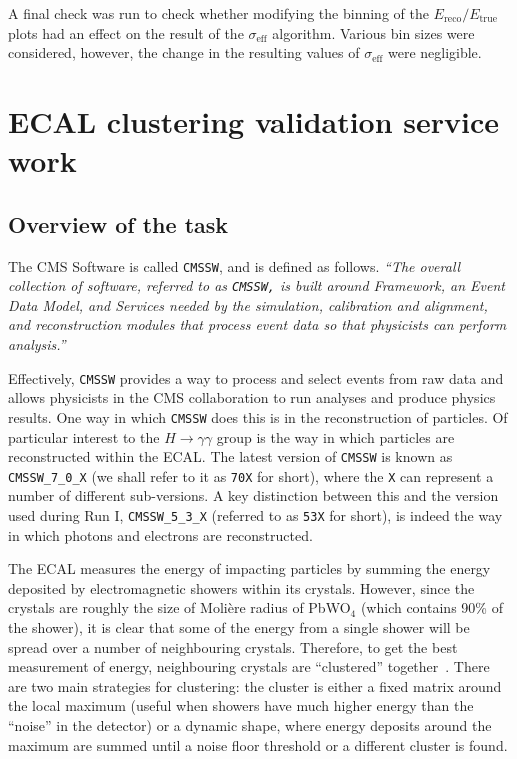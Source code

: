 \documentclass[10pt]{article}
\begin{document}
A final check was run to check whether modifying the binning of the $E_{\text{reco}}/E_{\text{true}}$ plots had an effect on the result of the $\sigma_{\text{eff}}$ algorithm. Various bin sizes were considered, however, the change in the resulting values of $\sigma_{\text{eff}}$ were negligible.

\section{ECAL clustering validation service work}
\subsection{Overview of the task}

The CMS Software is called \texttt{CMSSW}, and is defined as follows. \textit{``The overall collection of software, referred to as \texttt{CMSSW,} is built around Framework, an Event Data Model, and Services needed by the simulation, calibration and alignment, and reconstruction modules that process event data so that physicists can perform analysis.''}~\cite{CMSSW}

Effectively, \texttt{CMSSW} provides a way to process and select events from raw data and allows physicists in the CMS collaboration to run analyses and produce physics results. One way in which \texttt{CMSSW} does this is in the reconstruction of particles. Of particular interest to the $H \rightarrow \gamma \gamma$ group is the way in which particles are reconstructed within the ECAL. The latest version of \texttt{CMSSW} is known as \texttt{CMSSW\_7\_0\_X} (we shall refer to it as \texttt{70X} for short), where the \texttt{X} can represent a number of different sub-versions. A key distinction between this and the version used during Run I, \texttt{CMSSW\_5\_3\_X} (referred to as \texttt{53X} for short), is indeed the way in which photons and electrons are reconstructed. 

The ECAL measures the energy of impacting particles by summing the energy deposited by electromagnetic showers within its crystals. However, since the crystals are roughly the size of Molière radius of PbWO$_4$ (which contains 90\% of the shower), it is clear that some of the energy from a single shower will be spread over a number of neighbouring crystals. Therefore, to get the best measurement of energy, neighbouring crystals are ``clustered'' together~\cite{ecalShower}. There are two main strategies for clustering: the cluster is either a fixed matrix around the local maximum  (useful when showers have much higher energy than the ``noise'' in the detector) or a dynamic shape, where energy deposits around the maximum are summed until a noise floor threshold or a different cluster is found. 
\end{document}

